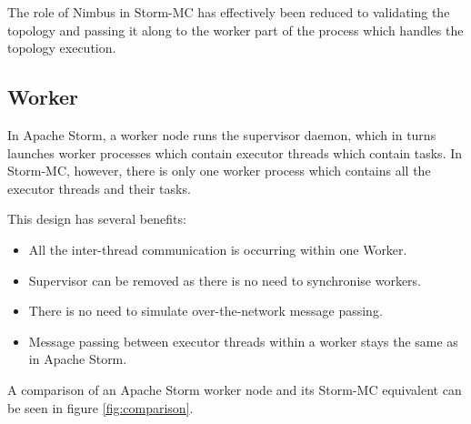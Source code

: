 \documentclass[bsc,logo,frontabs,twoside,singlespacing,normalheadings,parskip]{infthesis}\usepackage[]{graphicx}\usepackage[]{color}
\begin{document}
The role of Nimbus in Storm-MC has effectively been reduced to validating the topology and passing it along to the worker part of the process which handles the topology execution.

\subsection{Worker}

In Apache Storm, a worker node runs the supervisor daemon, which in turns launches worker processes which contain executor threads which contain tasks. In Storm-MC, however, there is only one worker process which contains all the executor threads and their tasks.

This design has several benefits:

\begin{itemize}
	\item All the inter-thread communication is occurring within one Worker.
	\item Supervisor can be removed as there is no need to synchronise workers.
	\item There is no need to simulate over-the-network message passing.
	\item Message passing between executor threads within a worker stays the same as in Apache Storm.
\end{itemize}

A comparison of an Apache Storm worker node and its Storm-MC equivalent can be seen in figure \ref{fig:comparison}.
\end{document}
